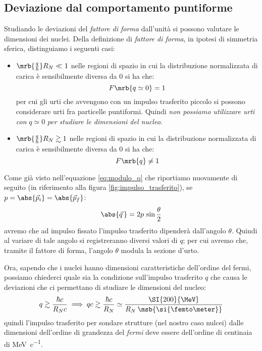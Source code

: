 \subsection{Deviazione dal comportamento puntiforme}
Studiando le deviazioni del \textit{fattore di forma} dall'unità si possono
valutare le dimensioni dei nuclei.
Della definizione di \textit{fattore di forma},  in ipotesi di simmetria
sferica, distinguiamo i seguenti casi:
\begin{itemize}
  \item $\mrb{\frac{q}{\hbar}} R_N \ll 1$ nelle regioni di spazio in cui la
    distribuzione normalizzata di carica è sensibilmente diversa da 0 si ha
    che:
    \begin{equation}
      F\mrb{q \simeq 0} = 1
    \end{equation}
    per cui gli urti che avvengono con un impulso trasferito piccolo si possono
    considerare urti fra particelle puntiformi. Quindi
    \textit{non possiamo utilizzare urti con} $q \simeq 0$ \textit{per studiare
    le dimensioni del nucleo}.
  \item $\mrb{\frac{q}{\hbar}} R_N \gtrsim 1$ nelle regioni di spazio in cui la
    distribuzione normalizzata di carica è sensibilmente diversa da 0 si ha
    che:
    \begin{equation}
      F\mrb{q} \neq 1
    \end{equation}
\end{itemize}
Come già visto nell'equazione \ref{eq:modulo_q} che riportiamo nuovamente di
seguito (in riferimento alla figura \ref{fig:impulso_trasferito}), se $p =
\abs{\vec{p}_i} = \abs{\vec{p}_f}$:
\begin{equation}
	\abs{\vec{q}\,} = 2p \, \sin\frac{\theta}{2}
\end{equation}
avremo che ad impulso fissato l'impulso trasferito dipenderà dall'angolo
$\theta$. Quindi al variare di tale angolo si registreranno diversi valori di
$q$; per cui avremo che, tramite il fattore di forma, l'angolo $\theta$ modula
la sezione d'urto.

Ora, sapendo che i nuclei hanno dimensioni caratteristiche dell'ordine del
fermi, possiamo chiederci quale sia la condizione sull'impulso trasferito $q$
che causa le deviazioni che ci permettano di studiare le dimensioni del nucleo:
\begin{equation}
  q \gtrsim \frac{\hbar c}{R_N c} \implies qc \gtrsim \frac{\hbar c}{R_N}
  \simeq \frac{\SI{200}{\MeV}}{R_N \: \msb{\si{\femto\meter}}}
\end{equation}
quindi l'impulso trasferito per sondare strutture (nel nostro caso nulcei)
dalle dimensioni dell'ordine di grandezza del \textit{fermi} deve essere
dell'ordine di centinaia di \si{\MeV \per c}.

